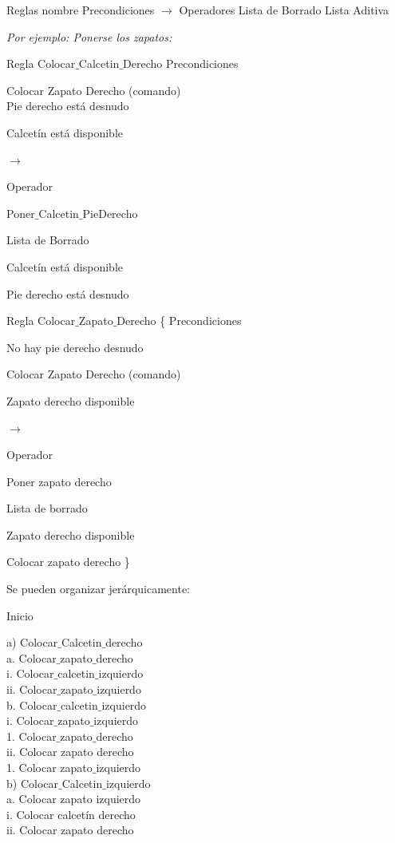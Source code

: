 Reglas nombre {
	Precondiciones
	$\rightarrow$
	Operadores
	Lista de Borrado
	Lista Aditiva
}


\textit{Por ejemplo: Ponerse los zapatos:}


Regla Colocar$\_$Calcetin$\_$Derecho
Precondiciones

Colocar Zapato Derecho (comando) \\

Pie derecho está desnudo

Calcetín está disponible

$\rightarrow$

Operador

Poner$\_$Calcetin$\_$PieDerecho

Lista de Borrado

Calcetín está disponible

Pie derecho está desnudo


Regla Colocar$\_$Zapato$\_$Derecho \{
	Precondiciones
	
	No hay pie derecho desnudo
	
	Colocar Zapato Derecho (comando)
	
	Zapato derecho disponible
	
	$\rightarrow$
	
	Operador
	
	Poner zapato derecho
	
	Lista de borrado
	
	Zapato derecho disponible
	
	Colocar zapato derecho
\}



Se pueden organizar jerárquicamente:

Inicio

a) Colocar$\_$Calcetin$\_$derecho \\
a. Colocar$\_$zapato$\_$derecho \\
i. Colocar$\_$calcetin$\_$izquierdo \\
ii. Colocar$\_$zapato$\_$izquierdo \\

b. Colocar$\_$calcetin$\_$izquierdo \\
i. Colocar$\_$zapato$\_$izquierdo \\
1. Colocar$\_$zapato$\_$derecho \\
ii. Colocar zapato derecho \\
1. Colocar zapato$\_$izquierdo \\

b) Colocar$\_$Calcetin$\_$izquierdo\\
a. Colocar zapato izquierdo\\
i. Colocar calcetín derecho\\
ii. Colocar zapato derecho\\

